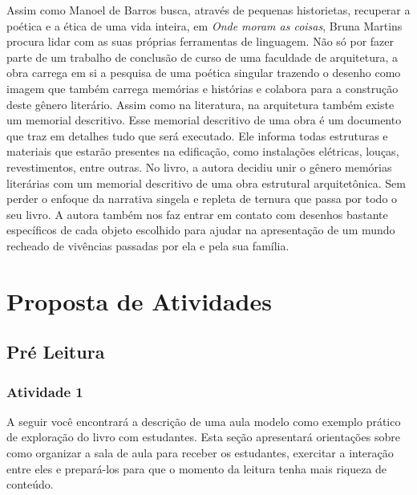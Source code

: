 \documentclass[11pt]{extarticle}
\begin{document}
Assim como Manoel de Barros busca, através de pequenas historietas, recuperar a poética e a ética de uma vida inteira, em \textit{Onde moram as coisas}, Bruna Martins procura lidar com as suas próprias ferramentas de linguagem. Não só por fazer parte de um trabalho de conclusão de curso de uma faculdade de arquitetura, a obra carrega em si a pesquisa de uma poética singular trazendo o desenho como imagem que também carrega memórias e histórias e colabora para a construção deste gênero literário. Assim como na literatura, na arquitetura também existe um memorial descritivo. Esse memorial descritivo de uma obra é um documento que traz em detalhes tudo que será executado. Ele informa todas estruturas e materiais que estarão presentes na edificação, como instalações elétricas, louças, revestimentos, entre outras. No livro, a autora decidiu unir o gênero memórias literárias com um memorial descritivo de uma obra estrutural arquitetônica. Sem perder o enfoque da narrativa singela e repleta de ternura que passa por todo o seu livro. A autora também nos faz entrar em contato com desenhos bastante específicos de cada objeto escolhido para ajudar na apresentação de um mundo recheado de vivências passadas por ela e pela sua família.

\section{Proposta de Atividades}
\subsection{Pré Leitura}
\subsubsection{Atividade 1}


A seguir você encontrará a descrição de uma aula modelo como exemplo prático de exploração do livro com estudantes. Esta seção apresentará orientações sobre como organizar a sala de aula para receber os estudantes, exercitar a interação entre eles e prepará-los para que o momento da leitura tenha mais riqueza de conteúdo. 
\end{document}
